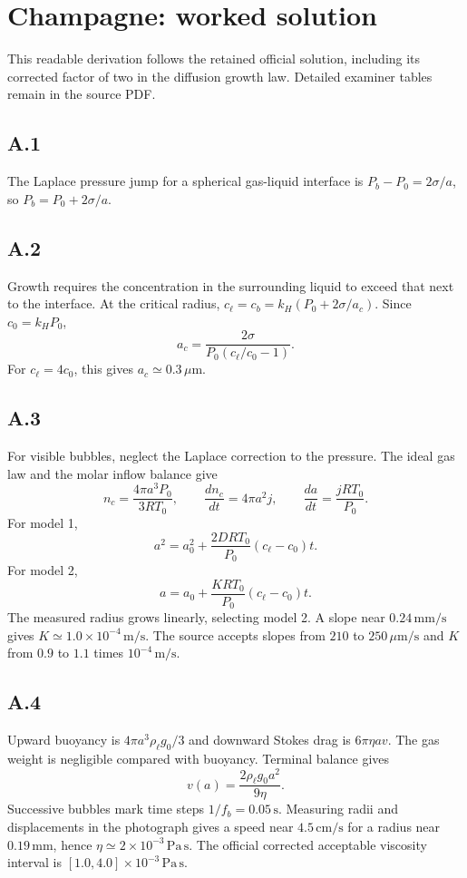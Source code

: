\documentclass{article}
\begin{document}
\section*{Champagne: worked solution}
This readable derivation follows the retained official solution, including its corrected factor of two in the diffusion growth law. Detailed examiner tables remain in the source PDF.
\subsection*{A.1}
The Laplace pressure jump for a spherical gas-liquid interface is $P_b-P_0=2\sigma/a$, so $P_b=P_0+2\sigma/a$.
\subsection*{A.2}
Growth requires the concentration in the surrounding liquid to exceed that next to the interface. At the critical radius, $c_\ell=c_b=k_H(P_0+2\sigma/a_c)$. Since $c_0=k_HP_0$,
\[a_c=\frac{2\sigma}{P_0(c_\ell/c_0-1)}.\]
For $c_\ell=4c_0$, this gives $a_c\simeq0.3\,\mu\mathrm m$.
\subsection*{A.3}
For visible bubbles, neglect the Laplace correction to the pressure. The ideal gas law and the molar inflow balance give
\[n_c=\frac{4\pi a^3P_0}{3RT_0},\qquad \frac{dn_c}{dt}=4\pi a^2j,\qquad \frac{da}{dt}=\frac{jRT_0}{P_0}.\]
For model 1,
\[a^2=a_0^2+\frac{2DRT_0}{P_0}(c_\ell-c_0)t.\]
For model 2,
\[a=a_0+\frac{KRT_0}{P_0}(c_\ell-c_0)t.\]
The measured radius grows linearly, selecting model 2. A slope near $0.24\,\mathrm{mm/s}$ gives $K\simeq1.0\times10^{-4}\,\mathrm{m/s}$. The source accepts slopes from $210$ to $250\,\mu\mathrm{m/s}$ and $K$ from $0.9$ to $1.1$ times $10^{-4}\,\mathrm{m/s}$.
\subsection*{A.4}
Upward buoyancy is $4\pi a^3\rho_\ell g_0/3$ and downward Stokes drag is $6\pi\eta av$. The gas weight is negligible compared with buoyancy. Terminal balance gives
\[v(a)=\frac{2\rho_\ell g_0a^2}{9\eta}.\]
Successive bubbles mark time steps $1/f_b=0.05\,\mathrm s$. Measuring radii and displacements in the photograph gives a speed near $4.5\,\mathrm{cm/s}$ for a radius near $0.19\,\mathrm{mm}$, hence $\eta\simeq2\times10^{-3}\,\mathrm{Pa\,s}$. The official corrected acceptable viscosity interval is $[1.0,4.0]\times10^{-3}\,\mathrm{Pa\,s}$.
\end{document}
